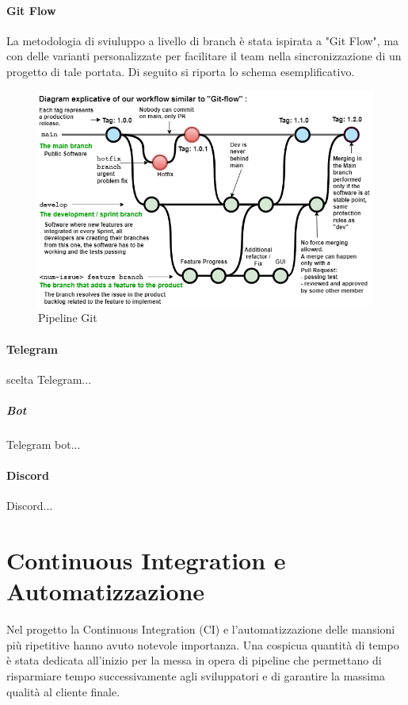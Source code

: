     \paragraph{Git Flow}
    La metodologia di sviuluppo a livello di branch è stata ispirata a "Git Flow", ma con delle varianti personalizzate per facilitare il team nella sincronizzazione di un progetto di tale portata. Di seguito si riporta lo schema esemplificativo.
    \begin{figure}[H]
        \caption{Pipeline Git}
        \label{fig:pipeline-git}
        \centering
        \includegraphics[width=1\textwidth]{Images/pipeline-git.png}
    \end{figure}
    
    
    \paragraph{Telegram}
    scelta Telegram...
        \subparagraph{Bot} 
        Telegram bot...
    
    \paragraph{Discord}
    Discord... 

\section{Continuous Integration e Automatizzazione}
\label{chap:CI}
Nel progetto la Continuous Integration (CI) e l'automatizzazione delle mansioni più ripetitive hanno avuto notevole importanza. Una cospicua quantità di tempo è stata dedicata all'inizio per la messa in opera di pipeline che permettano di risparmiare tempo successivamente agli sviluppatori e di garantire la massima qualità al cliente finale.
